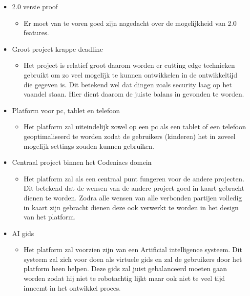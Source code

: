 \documentclass[]{report}
\begin{document}
\begin{itemize}
	\item 2.0 versie proof
	\begin{itemize}
		\item Er moet van te voren goed zijn nagedacht over de mogelijkheid van 2.0 features.
		\newline
	\end{itemize}

	\item Groot project krappe deadline 
	\begin{itemize}
		\item Het project is relatief groot daarom worden er cutting edge technieken gebruikt om zo veel mogelijk te kunnen ontwikkelen in de ontwikkeltijd die gegeven is. Dit betekend wel dat dingen zoals security laag op het vaandel staan. Hier dient daarom de juiste balans in gevonden te worden.
		\newline
	\end{itemize} 

	\item Platform voor pc, tablet en telefoon
	\begin{itemize}
		\item Het platform zal uiteindelijk zowel op een pc als een tablet of een telefoon geoptimaliseerd te worden zodat de gebruikers (kinderen) het in zoveel mogelijk settings zouden kunnen gebruiken.
		\newline
	\end{itemize} 

	\item Centraal project binnen het Codeniacs domein
	\begin{itemize}
		\item Het platform zal als een centraal punt fungeren voor de andere projecten. Dit betekend dat de wensen van de andere project goed in kaart gebracht dienen te worden. Zodra alle wensen van alle verbonden partijen volledig in kaart zijn gebracht dienen deze ook verwerkt te worden in het design van het platform. 
		\newline
	\end{itemize}

	\item AI gids
	\begin{itemize}
		\item Het platform zal voorzien zijn van een Artificial intelligence systeem. Dit systeem zal zich voor doen als virtuele gids en zal de gebruikers door het platform heen helpen. Deze gids zal juist gebalanceerd moeten gaan worden zodat hij niet te robotachtig lijkt maar ook niet te veel tijd inneemt in het ontwikkel proces.
		\newline
	\end{itemize}

\end{itemize} 
\end{document}
